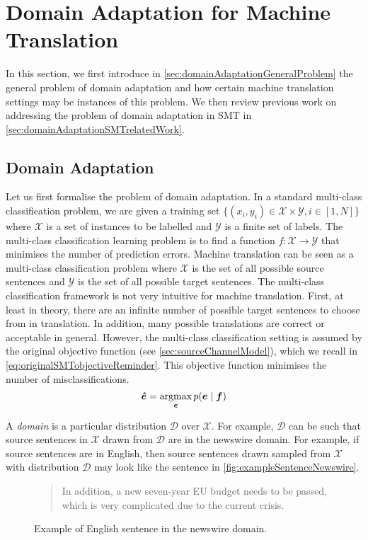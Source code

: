 \section{Domain Adaptation for Machine Translation}
\label{sec:domainAdaptationMT}

In this section, we first introduce in
\autoref{sec:domainAdaptationGeneralProblem} the general problem of domain
adaptation and how certain machine translation settings
may be instances of this problem. We then review
previous work on addressing the problem of domain adaptation
in SMT in \autoref{sec:domainAdaptationSMTrelatedWork}.

\subsection{Domain Adaptation}
\label{sec:domainAdaptationGeneralProblem}

Let us first formalise the problem of domain adaptation.
In a standard multi-class classification problem, we are
given a training set
$\{(x_i, y_i) \in \mathcal{X} \times \mathcal{Y}, i \in [1, N]\}$
where $\mathcal{X}$ is a set of instances to be labelled and
$\mathcal{Y}$ is a finite set of labels. The multi-class classification
learning problem
is to find a function $f : \mathcal{X} \rightarrow \mathcal{Y}$
that minimises the number of prediction errors.
Machine translation
can be seen as a multi-class classification problem where $\mathcal{X}$
is the set of all possible source sentences and $\mathcal{Y}$ is the set of
all possible target sentences. The multi-class classification framework is not very intuitive
for machine translation. First, at least in theory, there are an
infinite number of possible target sentences to choose from in translation.
In addition, many possible translations are correct
or acceptable in general.
However, the multi-class classification setting is assumed by the original objective
function (see \autoref{sec:sourceChannelModel}), which we
recall in \autoref{eq:originalSMTobjectiveReminder}. This objective
function minimises the number of misclassifications.
%
\begin{equation}
  \bm{\hat{e}} = \operatorname*{argmax}_{\bm{e}} p(\bm{e} \mid \bm{f})
  \label{eq:originalSMTobjectiveReminder}
\end{equation}
%

A \emph{domain} is a particular distribution $\mathcal{D}$
over $\mathcal{X}$. For example, $\mathcal{D}$ can be such that
source sentences in $\mathcal{X}$ drawn from $\mathcal{D}$ are
in the newswire
domain. For example, if source sentences are in English, then source sentences
drawn sampled from $\mathcal{X}$ with distribution $\mathcal{D}$
may look like
the sentence in \autoref{fig:exampleSentenceNewswire}.
%
\begin{figure}
  \begin{quote}
    In addition, a new seven-year EU budget needs to be passed, which is very complicated due to the current crisis.
  \end{quote}
  \caption{Example of English sentence in the newswire domain.}
  \label{fig:exampleSentenceNewswire}
\end{figure}
%

